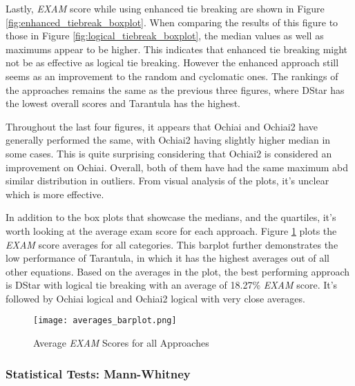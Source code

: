 Lastly, \emph{EXAM} score while using enhanced tie breaking are shown in Figure
\ref{fig:enhanced_tiebreak_boxplot}. When comparing the results of this figure
to those in Figure \ref{fig:logical_tiebreak_boxplot}, the median values as well
as maximums appear to be higher. This indicates that enhanced tie breaking might
not be as effective as logical tie breaking. However the enhanced approach still
seems as an improvement to the random and cyclomatic ones. The rankings of the
approaches remains the same as the previous three figures, where DStar has the
lowest overall scores and Tarantula has the highest.

Throughout the last four figures, it appears that Ochiai and Ochiai2 have
generally performed the same, with Ochiai2 having slightly higher median in some
cases. This is quite surprising considering that Ochiai2 is considered an
improvement on Ochiai. Overall, both of them have had the same maximum abd
similar distribution in outliers. From visual analysis of the plots, it's
unclear which is more effective.

In addition to the box plots that showcase the medians, and the quartiles, it's
worth looking at the average exam score for each approach. Figure
\ref{fig:averages_barplot} plots the \emph{EXAM} score averages for all
categories. This barplot further demonstrates the low performance of Tarantula,
in which it has the highest averages out of all other equations. Based on the
averages in the plot, the best performing approach is DStar with logical tie
breaking with an average of 18.27\% \emph{EXAM} score. It's followed by Ochiai
logical and Ochiai2 logical with very close averages.

\begin{figure}[!htb]
	\begin{center}
		\texttt{[image: averages\_barplot.png]}
        \caption{\label{fig:averages_barplot} Average \emph{EXAM} Scores for all
        Approaches}
	\end{center}
\end{figure}

\subsubsection{Statistical Tests: Mann-Whitney}
\label{subsubsec:statistical_test_mann_whitney}

